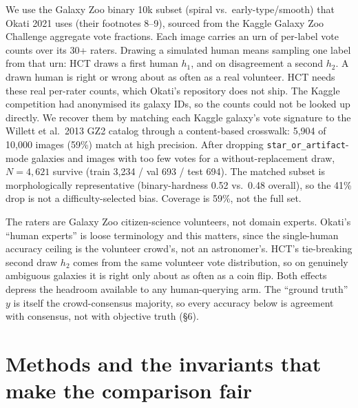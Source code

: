 \documentclass[10pt]{article}
\begin{document}
We use the Galaxy Zoo binary 10k subset (spiral vs.\ early-type/smooth) that Okati 2021 uses (their
footnotes 8--9), sourced from the Kaggle Galaxy Zoo Challenge aggregate vote fractions. Each image
carries an urn of per-label vote counts over its 30+ raters. Drawing a simulated human means
sampling one label from that urn: HCT draws a first human $h_1$, and on disagreement a second $h_2$.
A drawn human is right or wrong about as often as a real volunteer. HCT
needs these real per-rater counts, which Okati's repository does not ship. The Kaggle competition
had anonymised its galaxy IDs, so the counts could not be looked up directly. We recover them by
matching each Kaggle galaxy's vote signature to the Willett et al.\ 2013 GZ2 catalog through a
content-based crosswalk: 5{,}904 of 10{,}000 images (59\%) match at high precision. After dropping
\texttt{star\_or\_artifact}-mode galaxies and images with too few votes for a without-replacement
draw, $N = 4{,}621$ survive (train 3{,}234 / val 693 / test 694). The matched subset is
morphologically representative (binary-hardness 0.52 vs.\ 0.48 overall), so the 41\% drop is not a
difficulty-selected bias. Coverage is 59\%, not the full set.

The raters are Galaxy Zoo citizen-science volunteers, not domain experts. Okati's ``human experts''
is loose terminology and this matters, since the single-human accuracy ceiling is the volunteer
crowd's, not an astronomer's. HCT's tie-breaking second draw $h_2$ comes from the same volunteer
vote distribution, so on genuinely ambiguous galaxies it is right only about as often as a coin
flip. Both effects depress the headroom available to any human-querying arm. The ``ground truth''
$y$ is itself the crowd-consensus majority, so every accuracy below is agreement with consensus, not
with objective truth (\S6).

\section{Methods and the invariants that make the comparison fair}
\end{document}

